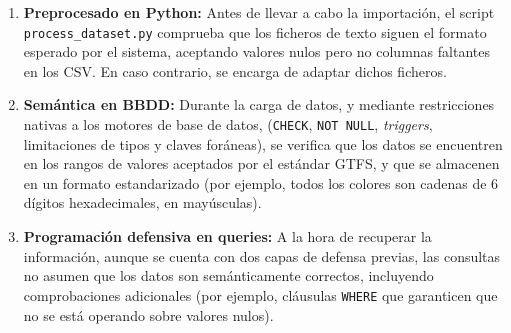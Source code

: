 \begin{enumerate}
    \item \textbf{Preprocesado en Python:} Antes de llevar a cabo la importación, el script \texttt{process\_dataset.py} comprueba que los ficheros de texto siguen el formato esperado por el sistema, aceptando valores nulos pero no columnas faltantes en los CSV. En caso contrario, se encarga de adaptar dichos ficheros.
    \item \textbf{Semántica en BBDD:} Durante la carga de datos, y mediante restricciones nativas a los motores de base de datos, (\texttt{CHECK}, \texttt{NOT NULL}, \textit{triggers}, limitaciones de tipos y claves foráneas), se verifica que los datos se encuentren en los rangos de valores aceptados por el estándar GTFS, y que se almacenen en un formato estandarizado (por ejemplo, todos los colores son cadenas de 6 dígitos hexadecimales, en mayúsculas).
    \item \textbf{Programación defensiva en queries:} A la hora de recuperar la información, aunque se cuenta con dos capas de defensa previas, las consultas no asumen que los datos son semánticamente correctos, incluyendo comprobaciones adicionales (por ejemplo, cláusulas \texttt{WHERE} que garanticen que no se está operando sobre valores nulos).
\end{enumerate}

